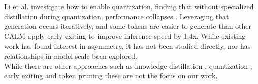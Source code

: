 Li et al. investigate how to enable quantization, finding that without specialized distillation during quantization, performance collapses \cite{Li2022DQBARTES}.
Leveraging that generation occurs iteratively, and some tokens are easier to generate than other CALM \cite{Schuster2022ConfidentAL} apply early exiting to improve inference speed by 1.4x. While existing work has found interest in asymmetry, it has not been studied directly, nor has relationships in model scale been explored. \\
While there are other approaches such as knowledge distillation \cite{Hinton2015DistillingTK} \cite{sanh2019distilbert} \cite{Jiao2020TinyBERTDB}, quantization \cite{Zafrir2019Q8BERTQ8}, early exiting \cite{Xin2020DeeBERTDE} and token pruning \cite{Kim2021LearnedTP} these are not the focus on our work. 